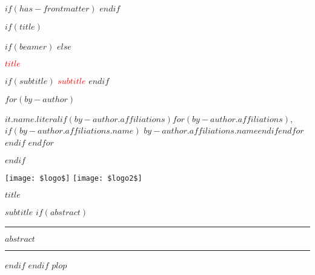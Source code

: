 
$if(has-frontmatter)$
\frontmatter
$endif$

$if(title)$

$if(beamer)$
\frame{\titlepage}
$else$

\begin{titlepage}
\BgThispage

\hspace{3cm}
\begin{minipage}{12.5cm}
  \vspace{5cm}
  \textcolor{red}{\Huge\textbf{\textsf{$title$}}}
 
  $if(subtitle)$
 \vspace{5mm}
  \textcolor{red}{\large\textbf{\textsf{$subtitle$}}}
 \vspace{5mm}
  $endif$
  \vspace{20mm}
  
  $for(by-author)$ 
  
   \textbf{$it.name.literal$}$if(by-author.affiliations)$$for(by-author.affiliations)$,$if(by-author.affiliations.name)$
           $by-author.affiliations.name$$endif$$endfor$
   $endif$
 $endfor$ %
 \end{minipage}
  
\end{titlepage}
$endif$
%
%
\newpage
\pagestyle{empty}
\begin{minipage}{\linewidth}

  \texttt{[image: \$logo\$]} \hspace{8cm}  \texttt{[image: \$logo2\$]}

\end{minipage}

\vspace{2cm}

\LARGE\textbf{$title$}

\large\textbf{$subtitle$}
$if(abstract)$

\vspace{2cm}

\begin{center}

\end{center}
\par\rule{\textwidth}{0.5pt} 

$abstract$

\par\rule{\textwidth}{0.5pt} 


$endif$
$endif$
$plop$
